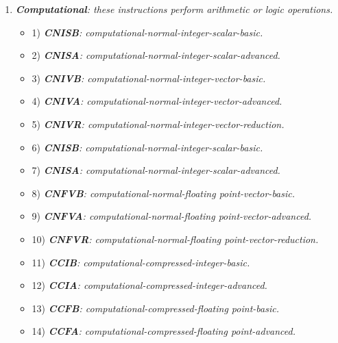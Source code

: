         \begin{enumerate}

            \item \textit{\textbf{Computational}: these instructions perform arithmetic or logic operations.}

                \begin{itemize}

                    \item 1) \textit{\textbf{CNISB}: computational-normal-integer-scalar-basic.}
                    \item 2) \textit{\textbf{CNISA}: computational-normal-integer-scalar-advanced.}

                    \item 3) \textit{\textbf{CNIVB}: computational-normal-integer-vector-basic.}
                    \item 4) \textit{\textbf{CNIVA}: computational-normal-integer-vector-advanced.}
                    \item 5) \textit{\textbf{CNIVR}: computational-normal-integer-vector-reduction.}

                    \item 6) \textit{\textbf{CNISB}: computational-normal-integer-scalar-basic.}
                    \item 7) \textit{\textbf{CNISA}: computational-normal-integer-scalar-advanced.}

                    \item 8) \textit{\textbf{CNFVB}: computational-normal-floating point-vector-basic.}
                    \item 9) \textit{\textbf{CNFVA}: computational-normal-floating point-vector-advanced.}
                    \item 10) \textit{\textbf{CNFVR}: computational-normal-floating point-vector-reduction.}

                    \item 11) \textit{\textbf{CCIB}: computational-compressed-integer-basic.}
                    \item 12) \textit{\textbf{CCIA}: computational-compressed-integer-advanced.}

                    \item 13) \textit{\textbf{CCFB}: computational-compressed-floating point-basic.}
                    \item 14) \textit{\textbf{CCFA}: computational-compressed-floating point-advanced.}


\end{itemize}
\end{enumerate}
